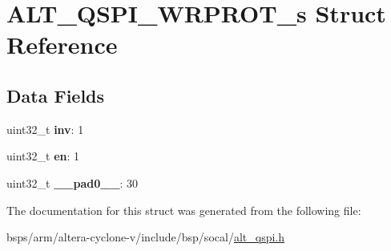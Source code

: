 \hypertarget{structALT__QSPI__WRPROT__s}{}\section{A\+L\+T\+\_\+\+Q\+S\+P\+I\+\_\+\+W\+R\+P\+R\+O\+T\+\_\+s Struct Reference}
\label{structALT__QSPI__WRPROT__s}
\subsection*{Data Fields}
\begin{DoxyCompactItemize}
\item 
\mbox{\label{structALT__QSPI__WRPROT__s_a9b59fe50b3f6093b92970deffef306dd}} 
uint32\+\_\+t {\bfseries inv}\+: 1
\item 
\mbox{\label{structALT__QSPI__WRPROT__s_a550b17edc460571982a915e5522b4a49}} 
uint32\+\_\+t {\bfseries en}\+: 1
\item 
\mbox{\label{structALT__QSPI__WRPROT__s_a844090dd60155a7805953c7f3a05a646}} 
uint32\+\_\+t {\bfseries \+\_\+\+\_\+pad0\+\_\+\+\_\+}\+: 30
\end{DoxyCompactItemize}


The documentation for this struct was generated from the following file\+:\begin{DoxyCompactItemize}
\item 
bsps/arm/altera-\/cyclone-\/v/include/bsp/socal/\mbox{\hyperlink{include_2bsp_2socal_2alt__qspi_8h}{alt\+\_\+qspi.\+h}}\end{DoxyCompactItemize}
